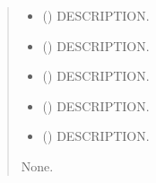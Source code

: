 \documentclass[letterpaper,10pt,english]{sphinxmanual}
\begin{document}
\begin{fulllineitems}
\label{\detokenize{MUFBVAR:MUFBVAR.mfbvar_funcs.prior_pdf}}
\pysigstartsignatures
{}
\pysigstopsignatures\begin{quote}\begin{description}
\begin{itemize}
\item {} 
\sphinxAtStartPar
{} () \textendash{} DESCRIPTION.

\item {} 
\sphinxAtStartPar
{} () \textendash{} DESCRIPTION.

\item {} 
\sphinxAtStartPar
{} () \textendash{} DESCRIPTION.

\item {} 
\sphinxAtStartPar
{} () \textendash{} DESCRIPTION.

\item {} 
\sphinxAtStartPar
{} () \textendash{} DESCRIPTION.

\end{itemize}

\sphinxAtStartPar
None.

\end{description}\end{quote}

\end{fulllineitems}

\end{document}
